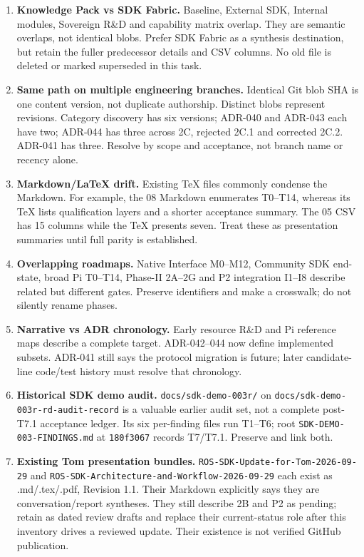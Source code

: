 \documentclass[
  10pt,
]{article}
\providecommand{\tightlist}{%
  \setlength{\itemsep}{0pt}\setlength{\parskip}{0pt}}
\begin{document}
\begin{enumerate}
\def\labelenumi{\arabic{enumi}.}
\tightlist
\item
  \textbf{Knowledge Pack vs SDK Fabric.} Baseline, External SDK,
  Internal modules, Sovereign R\&D and capability matrix overlap. They
  are semantic overlaps, not identical blobs. Prefer SDK Fabric as a
  synthesis destination, but retain the fuller predecessor details and
  CSV columns. No old file is deleted or marked superseded in this task.
\item
  \textbf{Same path on multiple engineering branches.} Identical Git
  blob SHA is one content version, not duplicate authorship. Distinct
  blobs represent revisions. Category discovery has six versions;
  ADR-040 and ADR-043 each have two; ADR-044 has three across 2C,
  rejected 2C.1 and corrected 2C.2. ADR-041 has three. Resolve by scope
  and acceptance, not branch name or recency alone.
\item
  \textbf{Markdown/LaTeX drift.} Existing TeX files commonly condense
  the Markdown. For example, the 08 Markdown enumerates T0--T14, whereas
  its TeX lists qualification layers and a shorter acceptance summary.
  The 05 CSV has 15 columns while the TeX presents seven. Treat these as
  presentation summaries until full parity is established.
\item
  \textbf{Overlapping roadmaps.} Native Interface M0--M12, Community SDK
  end-state, broad Pi T0--T14, Phase-II 2A--2G and P2 integration I1--I8
  describe related but different gates. Preserve identifiers and make a
  crosswalk; do not silently rename phases.
\item
  \textbf{Narrative vs ADR chronology.} Early resource R\&D and Pi
  reference maps describe a complete target. ADR-042--044 now define
  implemented subsets. ADR-041 still says the protocol migration is
  future; later candidate-line code/test history must resolve that
  chronology.
\item
  \textbf{Historical SDK demo audit.} \nolinkurl{docs/sdk-demo-003r/} on
  \nolinkurl{docs/sdk-demo-003r-rd-audit-record} is a valuable earlier
  audit set, not a complete post-T7.1 acceptance ledger. Its six
  per-finding files run T1--T6; root \nolinkurl{SDK-DEMO-003-FINDINGS.md}
  at \nolinkurl{180f3067} records T7/T7.1. Preserve and link both.
\item
  \textbf{Existing Tom presentation bundles.}
  \nolinkurl{ROS-SDK-Update-for-Tom-2026-09-29} and
  \nolinkurl{ROS-SDK-Architecture-and-Workflow-2026-09-29} each exist as
  .md/.tex/.pdf, Revision 1.1. Their Markdown explicitly says they are
  conversation/report syntheses. They still describe 2B and P2 as
  pending; retain as dated review drafts and replace their
  current-status role after this inventory drives a reviewed update.
  Their existence is not verified GitHub publication.
\end{enumerate}
\end{document}
